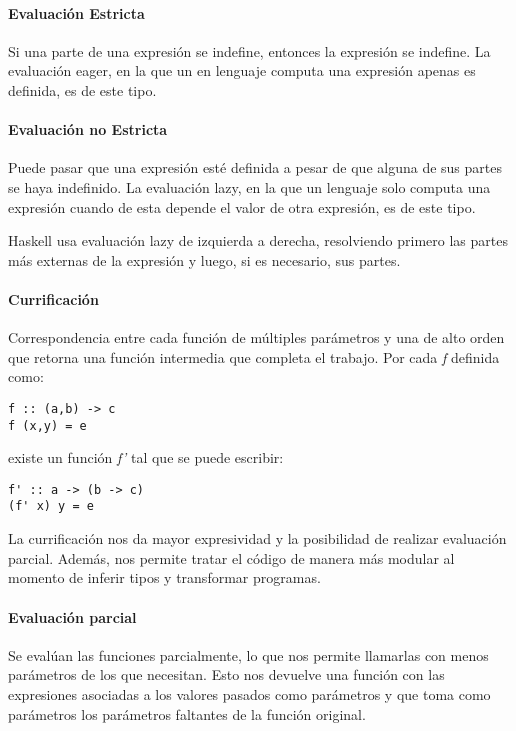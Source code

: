 \paragraph{Evaluación Estricta} Si una parte de una expresión se indefine, entonces la expresión se indefine. La evaluación eager, en la que un en lenguaje computa una expresión apenas es definida, es de este tipo. 

\paragraph{Evaluación no Estricta} Puede pasar que una expresión esté definida a pesar de que alguna de sus partes se haya indefinido. La evaluación lazy, en la que un lenguaje solo computa una expresión cuando de esta depende el valor de otra expresión, es de este tipo.

Haskell usa evaluación lazy de izquierda a derecha, resolviendo primero las partes más externas de la expresión y luego, si es necesario, sus partes.

\paragraph{Currificación} Correspondencia entre cada función de múltiples parámetros y una de alto orden que retorna una función intermedia que completa el trabajo.
Por cada \textit{f} definida como:
\begin{centrado}
	\begin{verbatim}
f :: (a,b) -> c
f (x,y) = e
	\end{verbatim}
\end{centrado} 
existe un función \textit{f'} tal que se puede escribir:
\begin{centrado}
	\begin{verbatim}
f' :: a -> (b -> c)
(f' x) y = e
	\end{verbatim}
\end{centrado} 

La currificación nos da mayor expresividad y la posibilidad de realizar evaluación parcial. Además, nos permite tratar el código de manera más modular al momento de inferir tipos y transformar programas.

\paragraph{Evaluación parcial} Se evalúan las funciones parcialmente, lo que nos permite llamarlas con menos parámetros de los que necesitan. Esto nos devuelve una función con las expresiones asociadas a los valores pasados como parámetros y que toma como parámetros los parámetros faltantes de la función original.

